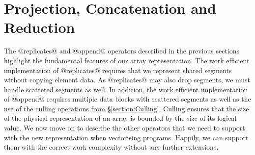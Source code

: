 
\section{Projection, Concatenation and Reduction}
The @replicates@ and @append@ operators described in the previous sections highlight the fundamental features of our array representation. The work efficient implementation of @replicates@ requires that we represent shared segments without copying element data. As @replicates@ may also drop segments, we must handle scattered segments as well. In addition, the work efficient implementation of @append@ requires multiple data blocks with scattered segments as well as the use of the culling operations from \S\ref{section:Culling}. Culling ensures that the size of the physical representation of an array is bounded by the size of its logical value. We now move on to describe the other operators that we need to support with the new representation when vectorising programs. Happily, we can support them with the correct work complexity without any further extensions.


